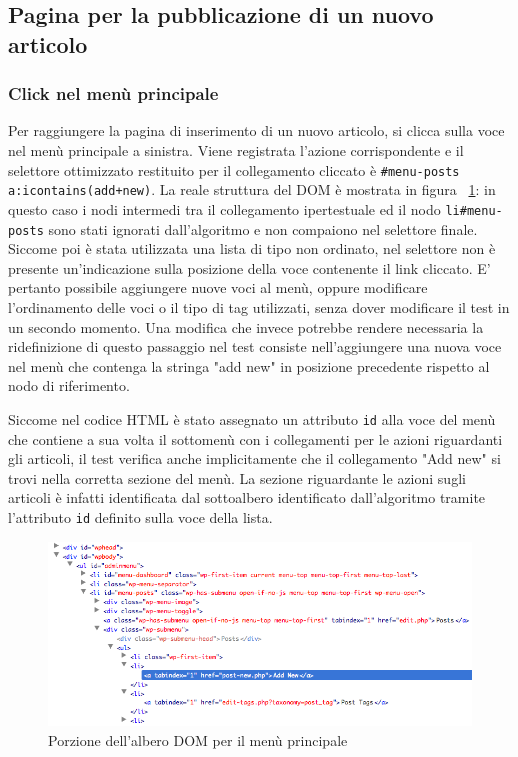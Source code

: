 \subsection{Pagina per la pubblicazione di un nuovo articolo}

\subsubsection{Click nel menù principale}

Per raggiungere la pagina di inserimento di un nuovo articolo, si clicca sulla voce nel menù principale a sinistra. Viene registrata l'azione corrispondente e il selettore ottimizzato restituito per il collegamento cliccato è \verb|#menu-posts a:icontains(add+new)|. La reale struttura del DOM è mostrata in figura ~\ref{fig:addNewDOM}: in questo caso i nodi intermedi tra il collegamento ipertestuale ed il nodo \verb|li#menu-posts| sono stati ignorati dall'algoritmo e non compaiono nel selettore finale. Siccome poi è stata utilizzata una lista di tipo non ordinato, nel selettore non è presente un'indicazione sulla posizione della voce contenente il link cliccato. E' pertanto possibile aggiungere nuove voci al menù, oppure modificare l'ordinamento delle voci o il tipo di tag utilizzati, senza dover modificare il test in un secondo momento. Una modifica che invece potrebbe rendere necessaria la ridefinizione di questo passaggio nel test consiste nell'aggiungere una nuova voce nel menù che contenga la stringa "add new" in posizione precedente rispetto al nodo di riferimento.

Siccome nel codice HTML è stato assegnato un attributo \verb|id| alla voce del menù che contiene a sua volta il sottomenù con i collegamenti per le azioni riguardanti gli articoli, il test verifica anche implicitamente che il collegamento "Add new" si trovi nella corretta sezione del menù. La sezione riguardante le azioni sugli articoli è infatti identificata dal sottoalbero identificato dall'algoritmo tramite l'attributo \verb|id| definito sulla voce della lista.

\begin{figure}[htbp]
\begin{center}
\includegraphics[width=\textwidth]{images/wp_tour/8_add_new_firebug.png}
\caption{Porzione dell'albero DOM per il menù principale}
\label{fig:addNewDOM}
\end{center}
\end{figure}

